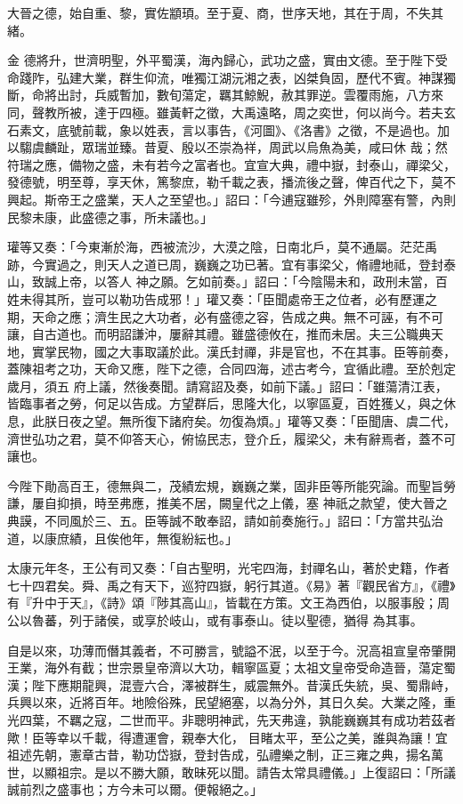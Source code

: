 \begin{pinyinscope}
 大晉之德，始自重、黎，實佐顓頊。至于夏、商，世序天地，其在于周，不失其緒。



 金
 德將升，世濟明聖，外平蜀漢，海內歸心，武功之盛，實由文德。至于陛下受命踐阼，弘建大業，群生仰流，唯獨江湖沅湘之表，凶桀負固，歷代不賓。神謀獨斷，命將出討，兵威暫加，數旬蕩定，羈其鯨鯢，赦其罪逆。雲覆雨施，八方來同，聲教所被，達于四極。雖黃軒之徵，大禹遠略，周之奕世，何以尚今。若夫玄石素文，底號前載，象以姓表，言以事告，《河圖》、《洛書》之徵，不是過也。加以騶虞麟趾，眾瑞並臻。昔夏、殷以丕崇為祥，周武以烏魚為美，咸曰休
 哉；然符瑞之應，備物之盛，未有若今之富者也。宜宣大典，禮中嶽，封泰山，禪梁父，發德號，明至尊，享天休，篤黎庶，勒千載之表，播流後之聲，俾百代之下，莫不興起。斯帝王之盛業，天人之至望也。」詔曰：「今逋寇雖殄，外則障塞有警，內則民黎未康，此盛德之事，所未議也。」



 瓘等又奏：「今東漸於海，西被流沙，大漠之陰，日南北戶，莫不通屬。茫茫禹跡，今實過之，則天人之道已周，巍巍之功已著。宜有事梁父，脩禮地祗，登封泰山，致誠上帝，以答人
 神之願。乞如前奏。」詔曰：「今陰陽未和，政刑未當，百姓未得其所，豈可以勒功告成邪！」瓘又奏：「臣聞處帝王之位者，必有歷運之期，天命之應；濟生民之大功者，必有盛德之容，告成之典。無不可誣，有不可讓，自古道也。而明詔謙沖，屢辭其禮。雖盛德攸在，推而未居。夫三公職典天地，實掌民物，國之大事取議於此。漢氏封禪，非是官也，不在其事。臣等前奏，蓋陳祖考之功，天命又應，陛下之德，合同四海，述古考今，宜循此禮。至於剋定歲月，須五
 府上議，然後奏聞。請寫詔及奏，如前下議。」詔曰：「雖蕩清江表，皆臨事者之勞，何足以告成。方望群后，思隆大化，以寧區夏，百姓獲乂，與之休息，此朕日夜之望。無所復下諸府矣。勿復為煩。」瓘等又奏：「臣聞唐、虞二代，濟世弘功之君，莫不仰答天心，俯協民志，登介丘，履梁父，未有辭焉者，蓋不可讓也。



 今陛下勛高百王，德無與二，茂績宏規，巍巍之業，固非臣等所能究論。而聖旨勞謙，屢自抑損，時至弗應，推美不居，闕皇代之上儀，塞
 神祇之款望，使大晉之典謨，不同風於三、五。臣等誠不敢奉詔，請如前奏施行。」詔曰：「方當共弘治道，以康庶績，且俟他年，無復紛紜也。」



 太康元年冬，王公有司又奏：「自古聖明，光宅四海，封禪名山，著於史籍，作者七十四君矣。舜、禹之有天下，巡狩四嶽，躬行其道。《易》著『觀民省方』，《禮》有『升中于天』，《詩》頌『陟其高山』，皆載在方策。文王為西伯，以服事殷；周公以魯蕃，列于諸侯，或享於岐山，或有事泰山。徒以聖德，猶得
 為其事。



 自是以來，功薄而僭其義者，不可勝言，號謚不泯，以至于今。況高祖宣皇帝肇開王業，海外有截；世宗景皇帝濟以大功，輯寧區夏；太祖文皇帝受命造晉，蕩定蜀漢；陛下應期龍興，混壹六合，澤被群生，威震無外。昔漢氏失統，吳、蜀鼎峙，兵興以來，近將百年。地險俗殊，民望絕塞，以為分外，其日久矣。大業之隆，重光四葉，不羈之寇，二世而平。非聰明神武，先天弗違，孰能巍巍其有成功若茲者歟！臣等幸以千載，得遭運會，親奉大化，
 目睹太平，至公之美，誰與為讓！宜祖述先朝，憲章古昔，勒功岱嶽，登封告成，弘禮樂之制，正三雍之典，揚名萬世，以顯祖宗。是以不勝大願，敢昧死以聞。請告太常具禮儀。」上復詔曰：「所議誠前烈之盛事也；方今未可以爾。便報絕之。」




\end{pinyinscope}
